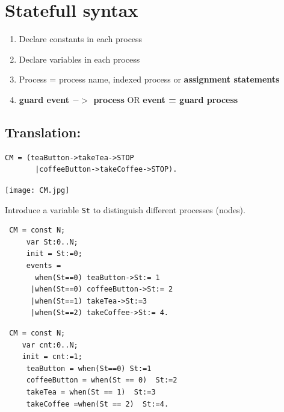 \documentclass[]{article}
\begin{document}
\newpage
{\color{red}
\section{Statefull syntax}
\begin{enumerate}
\item Declare constants in each process
\item Declare variables in each process
\item Process = process name, indexed process or {\bf assignment statements}
\item {\bf guard event $->$ process} OR  {\bf event = guard  process}
\end{enumerate}

\subsection{Translation:}

\begin{center}  \begin{minipage}{0.5\textwidth}
\begin{verbatim}CM = (teaButton->takeTea->STOP
       |coffeeButton->takeCoffee->STOP).\end{verbatim}
\end{minipage}
\begin{minipage}{0.45\textwidth}\texttt{[image: CM.jpg]}
\end{minipage}\end{center}

Introduce a variable \verb|St| to distinguish different processes (nodes).

\noindent\begin{minipage}{0.5\textwidth}
 \begin{verbatim}
 CM = const N;
     var St:0..N;
     init = St:=0;
     events =
       when(St==0) teaButton->St:= 1
      |when(St==0) coffeeButton->St:= 2
      |when(St==1) takeTea->St:=3
      |when(St==2) takeCoffee->St:= 4.
 \end{verbatim}
 \end{minipage}
 \begin{minipage}{0.45\textwidth}
 \begin{verbatim}
 CM = const N;
    var cnt:0..N;
    init = cnt:=1;
     teaButton = when(St==0) St:=1
     coffeeButton = when(St == 0)  St:=2
     takeTea = when(St == 1)  St:=3
     takeCoffee =when(St == 2)  St:=4.
   \end{verbatim}


\end{minipage}}
\end{document}
